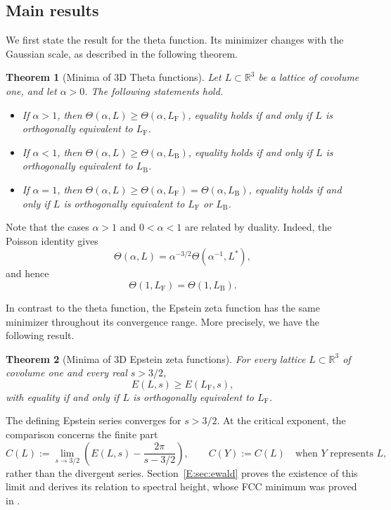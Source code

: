 \documentclass[reqno,english]{amsart}
\newtheorem{theorem}{Theorem}[section]
\theoremstyle{definition}
\newtheorem{open problem}[theorem]{Open Problem}
\theoremstyle{remark}
\theoremstyle{plain}
\newcommand{\R}{{\mathbb R}}
\numberwithin{equation}{section}
\newcommand{\FCC}{L_{\mathrm F}}
\newcommand{\B}{L_{\mathrm B}}
\newcommand{\BCC}{\B}
\newcommand{\Th}{\Theta}
\begin{document}
\subsection{Main results}
We first state the result for the theta function. Its minimizer changes
with the Gaussian scale, as described in the following theorem.
\begin{theorem}[Minima of 3D Theta functions]\label{T:thm:main}
Let $L\subset\R^3$ be a lattice of covolume one, and let
$\alpha>0$. The following statements hold.
\begin{itemize}
  \item [(1)] If $\alpha>1$, then $\Th(\alpha,L)\ge\Th(\alpha,\FCC)$, equality holds if and only if $L$ is orthogonally equivalent
to $\FCC$.
  \item [(2)] If $\alpha<1$, then $\Th(\alpha,L)\ge\Th(\alpha,\BCC)$, equality holds if and only if $L$ is orthogonally equivalent
to $\BCC$.
  \item [(3)] If $\alpha=1$, then $\Th(\alpha,L)\ge\Th(\alpha,\FCC)=\Th(\alpha,\BCC)$, equality holds if and only if $L$ is orthogonally
equivalent to $\FCC$ or $\BCC$.
\end{itemize}
\end{theorem}
Note that the cases $\alpha>1$ and $0<\alpha<1$ are related by duality.
Indeed, the Poisson identity \cite[(41)]{SS} gives
\begin{equation}\label{T:eq:poisson}
 \Th(\alpha,L)=\alpha^{-3/2}\Th(\alpha^{-1},L^*),
\end{equation}
and hence
\begin{equation}\label{T:eq:endpointtie}
 \Th(1,\FCC)=\Th(1,\BCC).
\end{equation}


In contrast to the theta function, the Epstein zeta function has the same
minimizer throughout its convergence range. More precisely, we have the
following result.
\begin{theorem}[Minima of 3D Epstein zeta functions]\label{E:thm:main}
For every lattice $L\subset\R^3$ of covolume one and every
real $s>3/2$,
\begin{equation}\label{E:eq:main-all}
 E(L,s)\ge E(\FCC,s),
\end{equation}
with equality if and only if $L$ is orthogonally equivalent to $\FCC$.

\end{theorem}
The defining Epstein series converges for $s>3/2$. At the critical
exponent, the comparison concerns the finite part
\[
 C(L):=\lim_{s\to3/2}
 \left(E(L,s)-\frac{2\pi}{s-3/2}\right),\qquad C(Y):=C(L)
 \quad\text{when }Y\text{ represents }L,
\]
rather than the divergent series. Section~\ref{E:sec:ewald} proves the
existence of this limit and derives its relation to spectral height,
whose FCC minimum was proved in \cite[Theorem~2]{SS}.
\end{document}
